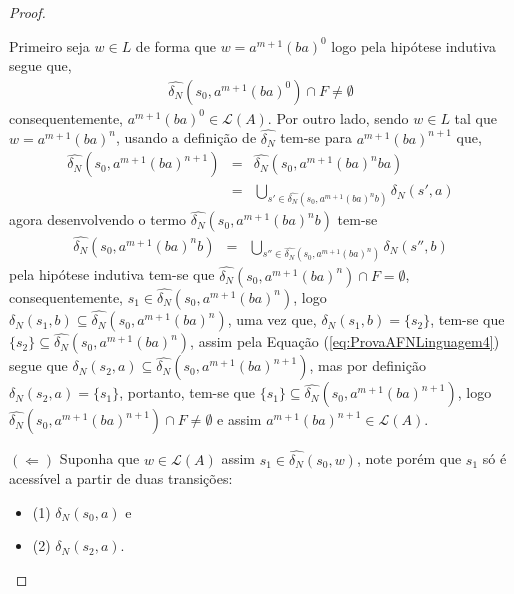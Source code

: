 \begin{example}
\begin{proof}
\begin{itemize}
			Primeiro seja $w \in L$ de forma que $w = a^{m+1}(ba)^0$ logo pela hipótese indutiva segue que, 
			\begin{eqnarray*}
				\widehat{\delta_N}(s_0, a^{m+1}(ba)^0) \cap F \neq \emptyset
			\end{eqnarray*}
			consequentemente, $a^{m+1}(ba)^0 \in \mathcal{L}(A)$. Por outro lado, sendo $w \in L$ tal que $w = a^{m+1}(ba)^n$, usando a  definição de $\widehat{\delta_N}$ tem-se para $a^{m+1}(ba)^{n+1}$ que, 
			\begin{eqnarray}\label{eq:ProvaAFNLinguagem4}
				\widehat{\delta_N}(s_0, a^{m+1}(ba)^{n+1}) & = & \widehat{\delta_N}(s_0, a^{m+1}(ba)^{n}ba)\nonumber\\
				& = & \bigcup_{s' \in \widehat{\delta_N}(s_0, a^{m+1}(ba)^{n}b)} \delta_N(s', a)
			\end{eqnarray}
			agora desenvolvendo o termo $\widehat{\delta_N}(s_0, a^{m+1}(ba)^{n}b)$ tem-se
			\begin{eqnarray*}
				\widehat{\delta_N}(s_0, a^{m+1}(ba)^{n}b) & = & \bigcup_{s'' \in \widehat{\delta_N}(s_0, a^{m+1}(ba)^{n})} \delta_N(s'', b)
			\end{eqnarray*}
			pela hipótese indutiva tem-se que $\widehat{\delta_N}(s_0, a^{m+1}(ba)^{n}) \cap F = \emptyset$, consequentemente, $s_1 \in \widehat{\delta_N}(s_0, a^{m+1}(ba)^{n})$, logo $\delta_N(s_1, b) \subseteq \widehat{\delta_N}(s_0, a^{m+1}(ba)^{n})$, uma vez que, $\delta_N(s_1, b) = \{s_2\}$, tem-se que $\{s_2\} \subseteq \widehat{\delta_N}(s_0, a^{m+1}(ba)^{n})$, assim pela Equação (\ref{eq:ProvaAFNLinguagem4}) segue que $\delta_N(s_2, a) \subseteq \widehat{\delta_N}(s_0, a^{m+1}(ba)^{n+1})$, mas por definição $\delta_N(s_2, a) = \{s_1\}$, portanto, tem-se que $\{s_1\} \subseteq \widehat{\delta_N}(s_0, a^{m+1}(ba)^{n+1})$, logo $\widehat{\delta_N}(s_0, a^{m+1}(ba)^{n+1}) \cap F \neq \emptyset$ e assim $a^{m+1}(ba)^{n+1} \in \mathcal{L}(A)$.
		\end{itemize}
		$(\Leftarrow)$ Suponha que $w \in \mathcal{L}(A)$ assim $s_1 \in \widehat{\delta_N}(s_0, w)$, note porém que $s_1$ só é acessível a partir de duas transições: 
		\begin{itemize}
			\item (1) $\delta_N(s_0, a)$ e
			\item (2) $\delta_N(s_2, a)$. 
		\end{itemize}

\end{proof}
\end{example}

